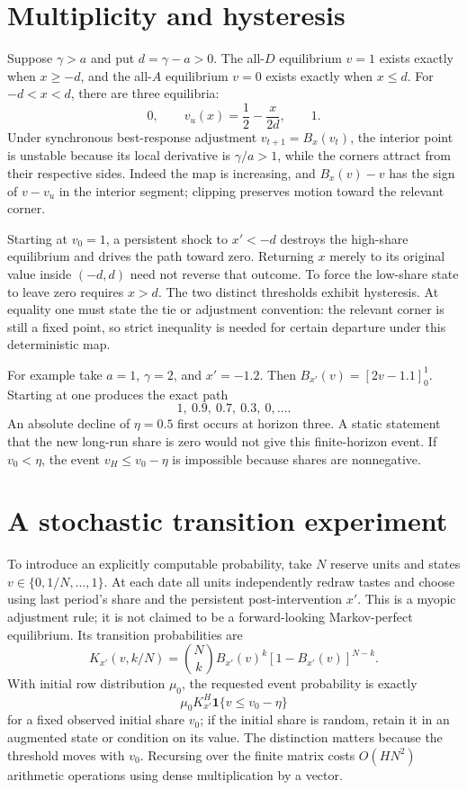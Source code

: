\documentclass[11pt]{article}
\begin{document}
\section*{Multiplicity and hysteresis}
Suppose $\gamma>a$ and put $d=\gamma-a>0$. The all-$D$ equilibrium $v=1$ exists exactly when $x\geq-d$, and the all-$A$ equilibrium $v=0$ exists exactly when $x\leq d$. For $-d<x<d$, there are three equilibria:
\[
 0,\qquad v_u(x)=\frac12-\frac{x}{2d},\qquad1.
\]
Under synchronous best-response adjustment $v_{t+1}=B_x(v_t)$, the interior point is unstable because its local derivative is $\gamma/a>1$, while the corners attract from their respective sides. Indeed the map is increasing, and $B_x(v)-v$ has the sign of $v-v_u$ in the interior segment; clipping preserves motion toward the relevant corner.

Starting at $v_0=1$, a persistent shock to $x'<-d$ destroys the high-share equilibrium and drives the path toward zero. Returning $x$ merely to its original value inside $(-d,d)$ need not reverse that outcome. To force the low-share state to leave zero requires $x>d$. The two distinct thresholds exhibit hysteresis. At equality one must state the tie or adjustment convention: the relevant corner is still a fixed point, so strict inequality is needed for certain departure under this deterministic map.

For example take $a=1$, $\gamma=2$, and $x'=-1.2$. Then
$B_{x'}(v)=[2v-1.1]_0^1$. Starting at one produces the exact path
\[
 1,\ 0.9,\ 0.7,\ 0.3,\ 0,\ldots.
\]
An absolute decline of $\eta=0.5$ first occurs at horizon three. A static statement that the new long-run share is zero would not give this finite-horizon event. If $v_0<\eta$, the event $v_H\leq v_0-\eta$ is impossible because shares are nonnegative.

\section*{A stochastic transition experiment}
To introduce an explicitly computable probability, take $N$ reserve units and states $v\in\{0,1/N,\ldots,1\}$. At each date all units independently redraw tastes and choose using last period's share and the persistent post-intervention $x'$. This is a myopic adjustment rule; it is not claimed to be a forward-looking Markov-perfect equilibrium. Its transition probabilities are
\[
 K_{x'}(v,k/N)=\binom Nk B_{x'}(v)^k[1-B_{x'}(v)]^{N-k}.
\]
With initial row distribution $\mu_0$, the requested event probability is exactly
\[
 \mu_0K_{x'}^H\mathbf1\{v\leq v_0-\eta\}
\]
for a fixed observed initial share $v_0$; if the initial share is random, retain it in an augmented state or condition on its value. The distinction matters because the threshold moves with $v_0$. Recursing over the finite matrix costs $O(HN^2)$ arithmetic operations using dense multiplication by a vector.
\end{document}
